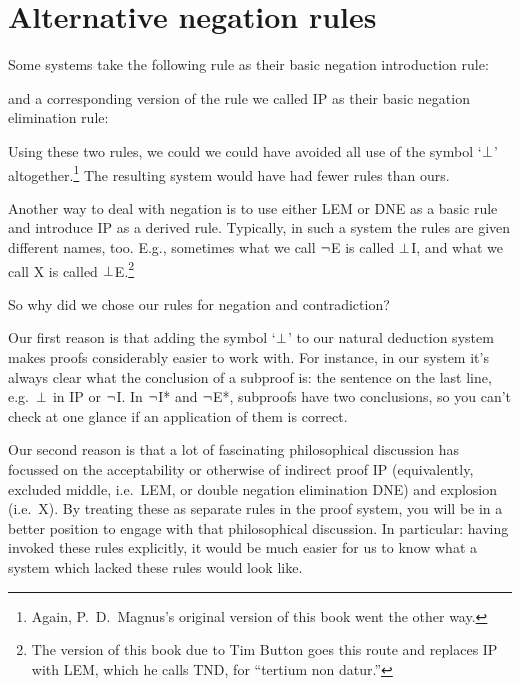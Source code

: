 \section{Alternative negation rules}
Some systems take the following rule as their basic negation introduction rule:
\begin{fitchproof}
	\open
	\close
\end{fitchproof}
and a corresponding version of the rule we called IP as their basic negation elimination rule:
\begin{fitchproof}
	\open
	\close
\end{fitchproof}
Using these two rules, we could we could have avoided all use of the symbol `$\bot$' altogether.\footnote{Again, P.~D.\ Magnus's original version of this book went the other way.} The resulting system would have had fewer rules than ours.

Another way to deal with negation is to use either LEM or DNE as a basic rule and introduce IP as a derived rule. Typically, in such a system the rules are given different names, too. E.g., sometimes what we call $\neg$E is called $\bot$I, and what we call X is called $\bot$E.\footnote{The version of this book due to Tim Button goes this route and replaces IP with LEM, which he calls TND, for ``tertium non datur.''}

So why did we chose our rules for negation and contradiction? 

Our first reason is that adding the symbol `$\bot$' to our natural deduction system makes proofs considerably easier to work with. For instance, in our system it's always clear what the conclusion of a subproof is: the sentence on the last line, e.g.\ $\bot$ in IP or $\neg$I. In $\neg$I* and $\neg$E*, subproofs have two conclusions, so you can't check at one glance if an application of them is correct.

Our second reason is that a lot of fascinating philosophical discussion has focussed on the acceptability or otherwise of indirect proof IP (equivalently, excluded middle, i.e.\ LEM, or double negation elimination DNE) and explosion (i.e.\ X). By treating these as separate rules in the proof system, you will be  in a better position to engage with that philosophical discussion. In particular: having invoked these rules explicitly, it would be much easier for us to know what a system which lacked these rules would look like.

